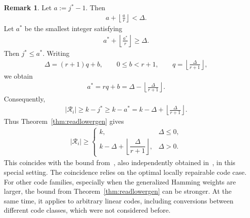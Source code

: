 \documentclass[conference, 10pt]{IEEEtran}
\theoremstyle{plain}
\theoremstyle{definition}
\newtheorem{remark}[definition]{Remark}
\newcommand{\mU}{\mathcal{U}}
\newcommand{\mR}{\mathcal{R}}
\begin{document}
\begin{remark}
Let $a:=j^*-1$. Then
\begin{align*}
    a+\left\lfloor\frac{a}{r}\right\rfloor<\Delta .
\end{align*}
Let $a^*$ be the smallest integer satisfying
\begin{align*}
    a^*+\left\lfloor\frac{a^*}{r}\right\rfloor\ge \Delta .
\end{align*}
Then $j^*\le a^*$. Writing
\begin{align*}
    \Delta=(r+1)q+b, \qquad 0\le b<r+1,
    \qquad q=\left\lfloor\frac{\Delta}{r+1}\right\rfloor,
\end{align*}
we obtain
\begin{align*}
    a^*=rq+b
    =\Delta-\left\lfloor\frac{\Delta}{r+1}\right\rfloor .
\end{align*}
Consequently,
\begin{align*}
    |\mR_i|
    \ge k-j^*
    \ge k-a^*
    = k-\Delta+\left\lfloor\frac{\Delta}{r+1}\right\rfloor .
\end{align*}
Thus Theorem~\ref{thm:readlowergen} gives
\begin{align*}
|\mR_i|
\ge
\begin{cases}
k, 
& \Delta\le 0,\\[0.5em]
k-\Delta+\left\lfloor \dfrac{\Delta}{r+1}\right\rfloor,
& \Delta>0 .
\end{cases}
\end{align*}
This coincides with the bound from~\cite{ge2025locally}, also independently obtained in~\cite{shi2025bounds}, in this special setting. The coincidence relies on the optimal locally repairable code case. For other code families, especially when the generalized Hamming weights are larger, the bound from Theorem~\ref{thm:readlowergen} can be stronger. At the same time, it applies to arbitrary linear codes, including conversions between different code classes, which were not considered before.


\end{remark}
\end{document}

